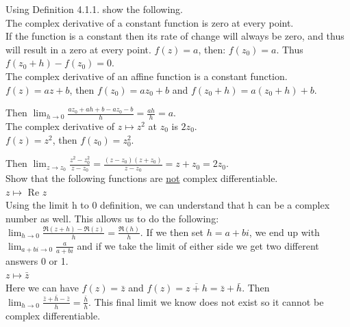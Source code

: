\documentclass[12pt]{article}
\begin{document}
 Using Definition 4.1.1. show the following. \\

 The complex derivative of a constant function is zero at every point.\\

If the function is a constant then its rate of change will always be zero, and thus will result in a zero at every point.
$f(z) = a$, then: $f(z_0) = a$.
Thus $f(z_0 + h) - f(z_0) = 0$.\\

 The complex derivative of an affine function is a constant function.\\

$f(z) = az + b$, then $f(z_0) = az_0 + b$ and $f(z_0 + h) = a(z_0 + h) + b$.

Then $\lim_{h\to 0} \frac{az_0 + ah + b - az_0 - b}{h} = \frac{ah}{h} = a$.\\


 The complex derivative of $z \mapsto z^2$ at $z_0$ is $2z_0$.\\

$f(z) = z^2$, then $f(z_0) = z^2_0$.

Then $\lim_{z\to z_0} \frac{z^2 - z^2_0}{z-z_0} = \frac{(z-z_0)(z+z_0)}{z-z_0} = z+z_0 = 2z_0$.\\


 Show that the following functions are \underline{not} complex differentiable.\\

 $z \mapsto $ Re $z$\\

Using the limit h to 0 definition, we can understand that h can be a complex number as well. 
This allows us to do the following: $\lim_{h\to 0}\frac{\Re(z + h) - \Re(z)}{h} = \frac{\Re(h)}{h}$.
If we then set $h = a + bi$, we end up with $\lim_{a+bi \to 0}\frac{a}{a+bi}$ and if we take the limit of either side we get two different answers 0 or 1.\\

 $z \mapsto \bar{z}$\\

Here we can have $f(z) = \bar{z}$ and $f(z) = \overline{z + h} = \bar{z} + \bar{h}$.
Then $\lim_{h\to 0 } \frac{\bar{z} + \bar{h} - \bar{z}}{h} = \frac{\bar{h}}{h}$. 
This final limit we know does not exist so it cannot be complex differentiable.\\
\end{document}
